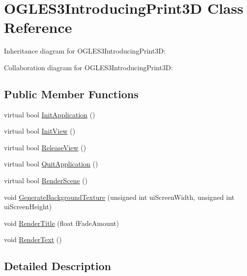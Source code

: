 \hypertarget{class_o_g_l_e_s3_introducing_print3_d}{\section{O\+G\+L\+E\+S3\+Introducing\+Print3\+D Class Reference}
\label{class_o_g_l_e_s3_introducing_print3_d}
}


Inheritance diagram for O\+G\+L\+E\+S3\+Introducing\+Print3\+D\+:


Collaboration diagram for O\+G\+L\+E\+S3\+Introducing\+Print3\+D\+:
\subsection*{Public Member Functions}
\begin{DoxyCompactItemize}
\item 
virtual bool \hyperlink{class_o_g_l_e_s3_introducing_print3_d_a2280934b49ab51dd9db3026d9f209405}{Init\+Application} ()
\item 
virtual bool \hyperlink{class_o_g_l_e_s3_introducing_print3_d_a5ac4bcf26918dcc91dd87473f8b5b57b}{Init\+View} ()
\item 
virtual bool \hyperlink{class_o_g_l_e_s3_introducing_print3_d_ab118d8247a503038300bc4c0be10262f}{Release\+View} ()
\item 
virtual bool \hyperlink{class_o_g_l_e_s3_introducing_print3_d_a4bab4dbe357d670513d9c1f6766532f8}{Quit\+Application} ()
\item 
virtual bool \hyperlink{class_o_g_l_e_s3_introducing_print3_d_af15a145b22637aa212ebe5ff1f5817d8}{Render\+Scene} ()
\item 
void \hyperlink{class_o_g_l_e_s3_introducing_print3_d_a4a57044dccf6ad0f20aa205542fce4c5}{Generate\+Background\+Texture} (unsigned int ui\+Screen\+Width, unsigned int ui\+Screen\+Height)
\item 
void \hyperlink{class_o_g_l_e_s3_introducing_print3_d_a0e04f8d21d0f35b4e36b2f096a87d3fa}{Render\+Title} (float f\+Fade\+Amount)
\item 
void \hyperlink{class_o_g_l_e_s3_introducing_print3_d_aaa06f89184fab1d820971dba0ee45076}{Render\+Text} ()
\end{DoxyCompactItemize}


\subsection{Detailed Description}


